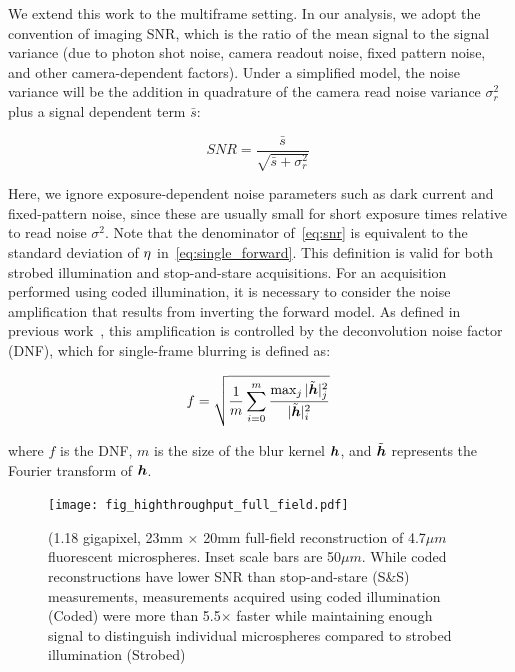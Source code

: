 We extend this work to the multiframe setting.
In our analysis, we adopt the convention of imaging SNR, which is the ratio of the mean signal to the signal variance (due to photon shot noise, camera readout noise, fixed pattern noise, and other camera-dependent factors). Under a simplified model, the noise variance will be the addition in quadrature of the camera read noise variance $\sigma^2_{r}$ plus a signal dependent term $\bar{s}$:

\begin{equation}
    \label{eq:snr}
    SNR = \frac{\bar{s}}{\sqrt{\bar{s} + \sigma^2_{r}}}\;
\end{equation}

Here, we ignore exposure-dependent noise parameters such as dark current and fixed-pattern noise, since these are usually small for short exposure times relative to read noise $\sigma^2$. Note that the denominator of~\eqref{eq:snr} is equivalent to the standard deviation of ${\eta}$ in~\eqref{eq:single_forward}. This definition is valid for both strobed illumination and stop-and-stare acquisitions. For an acquisition performed using coded illumination, it is necessary to consider the noise amplification that results from inverting the forward model. As defined in previous work~\cite{agrawal2009optimal}, this amplification is controlled by the deconvolution noise factor (DNF), which for single-frame blurring is defined as:

\begin{equation} \label{eq:DNF}
f = \sqrt{\frac{1}{m} \sum_{i=0}^m \frac{\max_j{|\tilde{\bm{h}}|_j^2}}{|\tilde{\bm{h}}|_i^2}}\:
\end{equation}

\noindent where $f$ is the DNF, $m$ is the size of the blur kernel $\bm{h}$, and $\tilde{\bm{h}}$ represents the Fourier transform of $\bm{h}$.

\begin{figure}
  \centering
    \texttt{[image: fig\_highthroughput\_full\_field.pdf]}

  \caption{(1.18 gigapixel, 23mm $\times$ 20mm full-field reconstruction of 4.7$\mu m$ fluorescent microspheres. Inset scale bars are 50$\mu m$. While coded reconstructions have lower SNR than stop-and-stare (S\&S) measurements, measurements acquired using coded illumination (Coded) were more than 5.5$\times$ faster while maintaining enough signal to distinguish individual microspheres compared to strobed illumination (Strobed)}

\end{figure}

